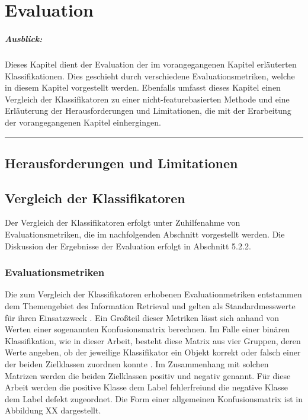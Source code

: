 
\chapter{Evaluation}

\paragraph{Ausblick:}
Dieses Kapitel dient der Evaluation der im vorangegangenen Kapitel erläuterten Klassifikationen. Dies geschieht durch verschiedene Evaluationsmetriken, welche in diesem Kapitel vorgestellt werden. Ebenfalls umfasst dieses Kapitel einen Vergleich der Klassifikatoren zu einer nicht-featurebasierten Methode und eine Erläuterung der Herausforderungen und Limitationen, die mit der Erarbeitung der vorangegangenen Kapitel einhergingen.
\\
\hrule

\section{Herausforderungen und Limitationen}

\section{Vergleich der Klassifikatoren}

Der Vergleich der Klassifikatoren erfolgt unter Zuhilfenahme von Evaluationsmetriken, die im nachfolgenden Abschnitt vorgestellt werden. Die Diskussion der Ergebnisse der Evaluation erfolgt in Abschnitt 5.2.2.

\subsection{Evaluationsmetriken}
\label{eval-metrics}

Die zum Vergleich der Klassifikatoren erhobenen Evaluationmetriken entstammen dem Themengebiet des Information Retrieval und gelten als Standardmesswerte für ihren Einsatzzweck \cite{Sammut2017}. Ein Großteil dieser Metriken lässt sich anhand von Werten einer sogenannten Konfusionsmatrix berechnen. Im Falle einer binären Klassifikation, wie in dieser Arbeit, besteht diese Matrix aus vier Gruppen, deren Werte angeben, ob der jeweilige Klassifikator ein Objekt korrekt oder falsch einer der beiden Zielklassen zuordnen konnte \cite{Sammut2017}. Im Zusammenhang mit solchen Matrizen werden die beiden Zielklassen \glqq positiv\grqq{} und \glqq negativ\grqq{} genannt. Für diese Arbeit werden die positive Klasse dem Label \glqq fehlerfrei\grqq und die negative Klasse dem Label \glqq defekt\grqq{} zugeordnet. Die Form einer allgemeinen Konfusionsmatrix ist in Abbildung XX dargestellt.

